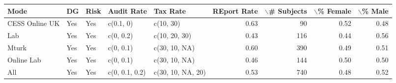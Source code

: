 \begin{tabular}{lllllrrrr}
  \hline
Mode & DG & Risk & Audit Rate & Tax Rate & REport Rate & $\backslash$\# Subjects & $\backslash$\% Female & $\backslash$\% Male \\ 
  \hline
CESS Online UK & Yes & Yes & c(0.1, 0) & c(10, 30) & 0.63 &  90 & 0.52 & 0.48 \\ 
  Lab & Yes & Yes & c(0, 0.2) & c(10, 20, 30) & 0.43 & 116 & 0.44 & 0.56 \\ 
  Mturk & Yes & Yes & c(0, 0.1) & c(30, 10, NA) & 0.60 & 390 & 0.49 & 0.51 \\ 
  Online Lab & Yes & Yes & c(0, 0.1) & c(30, 10, NA) & 0.46 & 144 & 0.50 & 0.50 \\ 
  All & Yes & Yes & c(0, 0.1, 0.2) & c(30, 10, NA, 20) & 0.53 & 740 & 0.48 & 0.52 \\ 
   \hline
\end{tabular}
